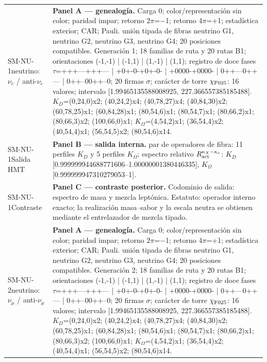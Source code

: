 \begin{longtable}{@{}>{\raggedright\arraybackslash}p{2.55cm}>{\raggedright\arraybackslash}p{11.75cm}@{}}
SM-NU-1\newline neutrino: \(\nu_e\) / anti-\(\nu_e\) & \textbf{Panel A --- genealogía. }Carga 0; color/representación sin color; paridad impar; retorno \(2\pi\)=\(-\)1; retorno \(4\pi\)=+1; estadística exterior; CAR; Pauli. unión tipada de fibras neutrino G1, neutrino G2, neutrino G3, neutrino G4; 20 posiciones compatibles. Generación 1; 18 familias de ruta y 20 rutas B1; orientaciones (-1,-1) | (-1,1) | (1,-1) | (1,1); registro de doce fases \(\tau\)=+++---+++--- | +0+-0-+0+-0- | +0000-+0000- | 0++---0++--- | 0++--00++--0; 20 firmas \(\sigma\); carácter de torre \(\chi_{\rm F025}\): 16 valores; intervalo [1.99465135588008925, 227.366557385185488]. \(K_D\)=(0,24,0)x2; (40,24,2)x4; (40,78,27)x4; (40,84,30)x2; (60,78,25)x1; (60,84,28)x1; (80,54,6)x1; (80,54,7)x1; (80,66,2)x1; (80,66,3)x2; (100,66,0)x1; \(K_{\Omega}\)=(4,54,2)x1; (36,54,4)x2; (40,54,4)x1; (56,54,5)x2; (80,54,6)x14. \\
SM-NU-1\newline Salida HMT & \textbf{Panel B --- salida interna. }par de operadores de fibra: 11 perfiles \(K_D\) y 5 perfiles \(K_{\Omega}\); espectro relativo \(R_{\rm act}^{\kappa_X-\kappa_e}\): \(K_D\) [0.999999944688771606--1.00000001380446335], \(K_{\Omega}\) [0.999999947310279053--1]. \\
SM-NU-1\newline Contraste & \textbf{Panel C --- contraste posterior. }Codominio de salida: espectro de masa y mezcla leptónica. Estatuto: operador interno exacto; la realización masa--sabor y la escala neutra se obtienen mediante el entrelazador de mezcla tipado. \\\addlinespace[2pt]
SM-NU-2\newline neutrino: \(\nu_\mu\) / anti-\(\nu_\mu\) & \textbf{Panel A --- genealogía. }Carga 0; color/representación sin color; paridad impar; retorno \(2\pi\)=\(-\)1; retorno \(4\pi\)=+1; estadística exterior; CAR; Pauli. unión tipada de fibras neutrino G1, neutrino G2, neutrino G3, neutrino G4; 20 posiciones compatibles. Generación 2; 18 familias de ruta y 20 rutas B1; orientaciones (-1,-1) | (-1,1) | (1,-1) | (1,1); registro de doce fases \(\tau\)=+++---+++--- | +0+-0-+0+-0- | +0000-+0000- | 0++---0++--- | 0++--00++--0; 20 firmas \(\sigma\); carácter de torre \(\chi_{\rm F025}\): 16 valores; intervalo [1.99465135588008925, 227.366557385185488]. \(K_D\)=(0,24,0)x2; (40,24,2)x4; (40,78,27)x4; (40,84,30)x2; (60,78,25)x1; (60,84,28)x1; (80,54,6)x1; (80,54,7)x1; (80,66,2)x1; (80,66,3)x2; (100,66,0)x1; \(K_{\Omega}\)=(4,54,2)x1; (36,54,4)x2; (40,54,4)x1; (56,54,5)x2; (80,54,6)x14. \\

\end{longtable}

